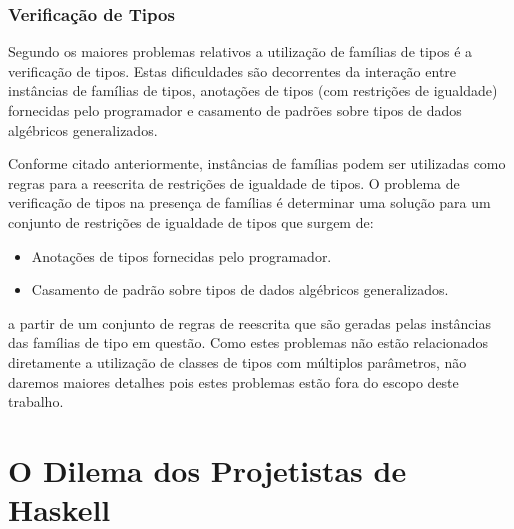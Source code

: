 \subsubsection{Verifica\c{c}\~ao de Tipos}

Segundo \cite{Schrijvers2008} os maiores problemas relativos a utiliza\c{c}\~ao de fam\'ilias de tipos \'e a 
verifica\c{c}\~ao de tipos. Estas dificuldades s\~ao decorrentes da intera\c{c}\~ao entre inst\^ancias de fam\'ilias
de tipos, anota\c{c}\~oes de tipos (com restri\c{c}\~oes de igualdade) fornecidas pelo programador e 
casamento de padr\~oes sobre tipos de dados alg\'ebricos generalizados.

Conforme citado anteriormente, inst\^ancias de fam\'ilias podem ser utilizadas como regras para a reescrita de 
restri\c{c}\~oes de igualdade de tipos. O problema de verifica\c{c}\~ao de tipos na presen\c{c}a de fam\'ilias \'e
determinar uma solu\c{c}\~ao para um conjunto de restri\c{c}\~oes de igualdade de tipos que surgem de:
\begin{itemize}
	\item Anota\c{c}\~oes de tipos fornecidas pelo programador.
	\item Casamento de padr\~ao sobre tipos de dados alg\'ebricos generalizados. 
\end{itemize}
a partir de um conjunto de regras de reescrita que s\~ao geradas pelas inst\^ancias das fam\'ilias de tipo em quest\~ao.
Como estes problemas n\~ao est\~ao relacionados diretamente a utiliza\c{c}\~ao de classes de tipos com m\'ultiplos 
par\^ametros, n\~ao daremos maiores detalhes pois estes problemas est\~ao fora do escopo deste trabalho. 
 
\section{O Dilema dos Projetistas de Haskell}

